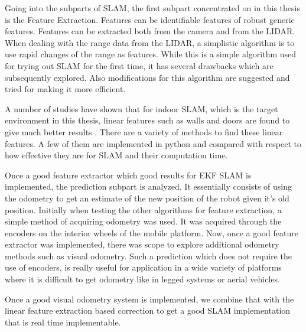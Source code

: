	Going into the subparts of SLAM, the first subpart concentrated on in this thesis is the Feature Extraction. Features can be identifiable features of robust generic features. Features can be extracted both from the camera and from the LIDAR. When dealing with the range data from the LIDAR, a simplistic algorithm is to use rapid changes of the range as features. While this is a simple algorithm used for trying out SLAM for the first time, it has several drawbacks which are subsequently explored. Also modifications for this algorithm are suggested and tried for making it more efficient. 
	
	A number of studies have shown that for indoor SLAM, which is the target environment in this thesis, linear features such as walls and doors are found to give much better results \cite{}. There are a variety of methods\cite{} to find these linear features. A few of them are implemented in python\cite{} and compared with respect to how effective they are for SLAM and their computation time.
	
	Once a good feature extractor which good results for EKF SLAM is implemented, the prediction subpart is analyzed. It essentially consists of using the odometry to get an estimate of the new position of the robot given it's old position. Initially when testing the other algorithms for feature extraction, a simple method of acquiring odometry was used. It was acquired through the encoders on the interior wheels of the mobile platform. Now, once a good feature extractor was implemented, there was scope to explore additional odometry methods such as visual odometry. Such a prediction which does not require the use of encoders, is really useful for application in a wide variety of platforms\cite{} where it is difficult to get odometry like in legged systems or aerial vehicles. 
	
	Once a good visual odometry system is implemented, we combine that with the linear feature extraction based correction to get a good SLAM implementation that is real time implementable. 
	
	
	

	
	